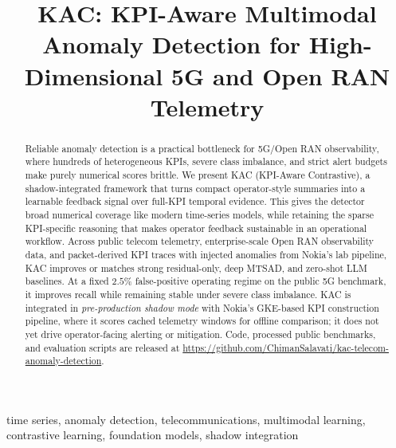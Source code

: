 \documentclass[conference]{IEEEtran}
\begin{document}
\title{KAC: KPI-Aware Multimodal Anomaly Detection for High-Dimensional 5G and Open RAN Telemetry}

\author{
}

\maketitle

\begin{abstract}
Reliable anomaly detection is a practical bottleneck for 5G/Open RAN observability, where hundreds of heterogeneous KPIs, severe class imbalance, and strict alert budgets make purely numerical scores brittle.
We present KAC (KPI-Aware Contrastive), a shadow-integrated framework that turns compact operator-style summaries into a learnable feedback signal over full-KPI temporal evidence.
This gives the detector broad numerical coverage like modern time-series models, while retaining the sparse KPI-specific reasoning that makes operator feedback sustainable in an operational workflow.
Across public telecom telemetry, enterprise-scale Open RAN observability data, and packet-derived KPI traces with injected anomalies from Nokia's lab pipeline, KAC improves or matches strong residual-only, deep MTSAD, and zero-shot LLM baselines.
At a fixed $2.5\%$ false-positive operating regime on the public 5G benchmark, it improves recall while remaining stable under severe class imbalance.
KAC is integrated in \emph{pre-production shadow mode} with Nokia's GKE-based KPI construction pipeline, where it scores cached telemetry windows for offline comparison; it does not yet drive operator-facing alerting or mitigation.
Code, processed public benchmarks, and evaluation scripts are released at \url{https://github.com/ChimanSalavati/kac-telecom-anomaly-detection}.
\end{abstract}

\begin{IEEEkeywords}
time series, anomaly detection, telecommunications, multimodal learning, contrastive learning, foundation models, shadow integration
\end{IEEEkeywords}
\end{document}
